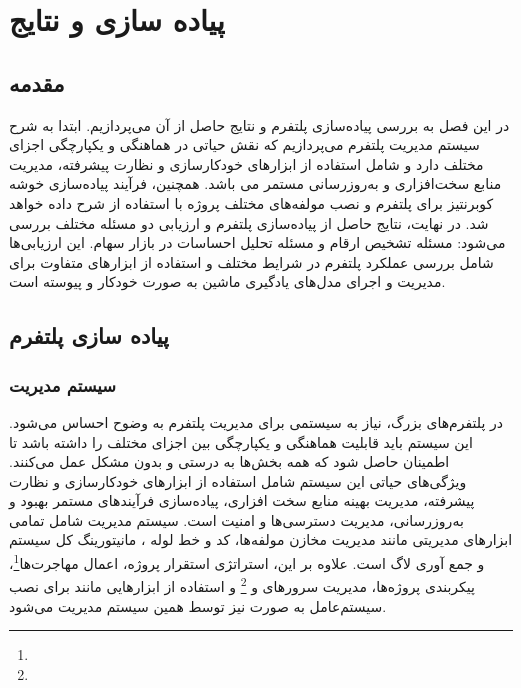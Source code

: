 \chapter{پیاده سازی و نتایج}

\section{مقدمه}
در این فصل به بررسی پیاده‌سازی پلتفرم و نتایج حاصل از آن می‌پردازیم. ابتدا به شرح سیستم مدیریت پلتفرم می‌پردازیم که نقش حیاتی در هماهنگی و یکپارچگی اجزای مختلف دارد و شامل استفاده از ابزارهای خودکارسازی و نظارت پیشرفته، مدیریت منابع سخت‌افزاری و به‌روزرسانی مستمر می باشد. همچنین، فرآیند پیاده‌سازی خوشه کوبرنتیز برای پلتفرم  و نصب مولفه‌های مختلف پروژه با استفاده از  شرح داده خواهد شد. در نهایت، نتایج حاصل از پیاده‌سازی پلتفرم و ارزیابی دو مسئله مختلف بررسی می‌شود: مسئله تشخیص ارقام و مسئله تحلیل احساسات در بازار سهام. این ارزیابی‌ها شامل بررسی عملکرد پلتفرم در شرایط مختلف و استفاده از ابزارهای متفاوت برای مدیریت و اجرای مدل‌های یادگیری ماشین به صورت خودکار و پیوسته است. 

\section{پیاده سازی پلتفرم}
\subsection{سیستم مدیریت}

در پلتفرم‌های بزرگ، نیاز به سیستمی برای مدیریت پلتفرم به وضوح احساس می‌شود. این سیستم باید قابلیت هماهنگی و یکپارچگی بین اجزای مختلف را داشته باشد تا اطمینان حاصل شود که همه بخش‌ها به درستی و بدون مشکل عمل می‌کنند. ویژگی‌های حیاتی این سیستم شامل استفاده از ابزارهای خودکارسازی و نظارت پیشرفته، مدیریت بهینه منابع سخت افزاری، پیاده‌سازی فرآیندهای مستمر بهبود و به‌روزرسانی، مدیریت دسترسی‌ها و امنیت است. سیستم مدیریت شامل تمامی ابزارهای مدیریتی مانند مدیریت مخازن مولفه‌ها، کد و خط لوله ، مانیتورینگ کل سیستم و جمع آوری لاگ است. علاوه بر این، استراتژی استقرار پروژه، اعمال مهاجرت‌ها\footnote{}، پیکربندی پروژه‌ها، مدیریت سرورهای  و \footnote{} و استفاده از ابزارهایی مانند  برای نصب سیستم‌عامل به صورت  نیز توسط همین سیستم مدیریت می‌شود.

